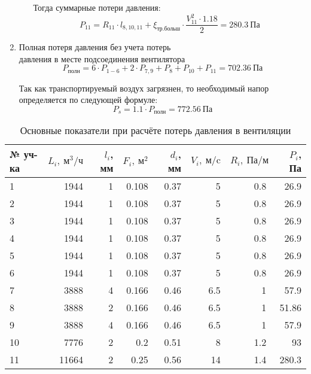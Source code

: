 \begin{enumerate}
\begin{itemize}
                    Тогда суммарные потери давления:
                    $$
                        P_{11} = R_{11} \cdot l_{8,10,11}
                                    + \xi_\text{тр.больш} \cdot \frac{V_{11}^2 \cdot 1.18}{2}
                                = 280.3 ~\text{Па}
                    $$
        \end{itemize}

        \item   Полная потеря давления без учета потерь \\ давления в месте
                подсоединения вентилятора
                $$
                    P_\text{полн} = 6 \cdot P_{1-6} + 2 \cdot P_{7,9} + P_{8} + P_{10} + P_{11}
                                = 702.36 ~\text{Па}
                $$

                Так как транспортируемый воздух загрязнен, то необходимый напор
                определяется по следующей формуле:
                $$
                    P_s = 1.1 \cdot P_\text{полн} = 772.56 ~\text{Па}
                $$
\end{enumerate}

\begin{table}[ht]
    \centering
    \begin{tabular}{l|r|r|r|r|r|r|r}
        № уч-ка & $L_i, ~\text{м}^3/\text{ч}$  & $\textit{l}_i$, мм & $F_i, ~\text{м}^2$
        & $d_i$, мм & $V_i, ~\text{м/c}$ & $R_i, ~\text{Па/м}$ & $P_i$, Па              \\ \hline
        1   & 1944  & 1 & 0.108 & 0.37  & 5     & 0.8   & 26.9                          \\
        2   & 1944  & 1 & 0.108 & 0.37  & 5     & 0.8   & 26.9                          \\
        3   & 1944  & 1 & 0.108 & 0.37  & 5     & 0.8   & 26.9                          \\
        4   & 1944  & 1 & 0.108 & 0.37  & 5     & 0.8   & 26.9                          \\
        5   & 1944  & 1 & 0.108 & 0.37  & 5     & 0.8   & 26.9                          \\
        6   & 1944  & 1 & 0.108 & 0.37  & 5     & 0.8   & 26.9                          \\
        7   & 3888  & 4 & 0.166 & 0.46  & 6.5   & 1     & 57.9                          \\
        8   & 3888  & 2 & 0.166 & 0.46  & 6.5   & 1     & 51.86                         \\
        9   & 3888  & 4 & 0.166 & 0.46  & 6.5   & 1     & 57.9                          \\
        10  & 7776  & 2 & 0.2   & 0.51  & 8     & 1.2   & 93                            \\
        11  & 11664 & 2 & 0.25  & 0.56  & 14    & 1.4   & 280.3                         \\

    \end{tabular}
    \caption{Основные показатели при расчёте потерь давления в вентиляции}
    \label{pressure_drop_calc_parameters}
\end{table}
